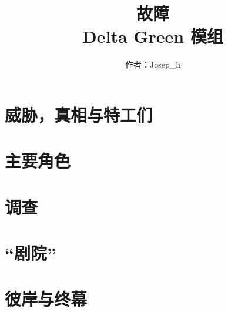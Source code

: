 \documentclass[letterpaper,twocolumn,nodeprecatedcode, oneside, AutoFakeBold, 10pt]{dndbook}
\title{\Huge 故障 \\
\Large Delta Green 模组}
\author{作者：Josep\_h}
\date{}
\begin{document}


% 





\mainmatter

\chapter{威胁，真相与特工们}





% 

\chapter{主要角色}

% 

\chapter{调查}
% 
% 












\chapter{“剧院”}


\chapter{彼岸与终幕}


\appendix







% 
\end{document}
